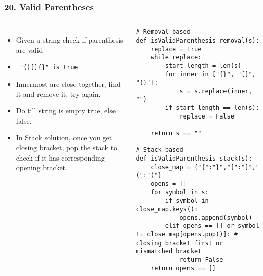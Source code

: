 \begin{frame}[fragile]\frametitle{20. Valid Parentheses}

	\begin{columns}[T]
	\begin{itemize}
	\item Given a string check if parenthesis are valid
	\item \lstinline| "()[]{}" is true|
	\item Innermost are close together, find it and remove it, try again.
	\item Do till string is empty  true, else false.
	\item In Stack solution, once you get closing bracket, pop the stack to check if it has corresponding opening bracket.
	\end{itemize}
		\begin{lstlisting}[basicstyle=\scriptsize]
# Removal based
def isValidParenthesis_removal(s):		
    replace = True
    while replace:
        start_length = len(s)
        for inner in ["{}", "[]", "()"]:
            s = s.replace(inner, "")
        if start_length == len(s):
            replace = False

    return s == ""
		
# Stack based
def isValidParenthesis_stack(s):
    close_map = {"{":"}","[":"]","(":")"}
    opens = []
    for symbol in s:
        if symbol in close_map.keys():
            opens.append(symbol)
        elif opens == [] or symbol != close_map[opens.pop()]: # closing bracket first or mismatched bracket
            return False
    return opens == []		
				\end{lstlisting}		

	\end{columns}
		
\end{frame}


